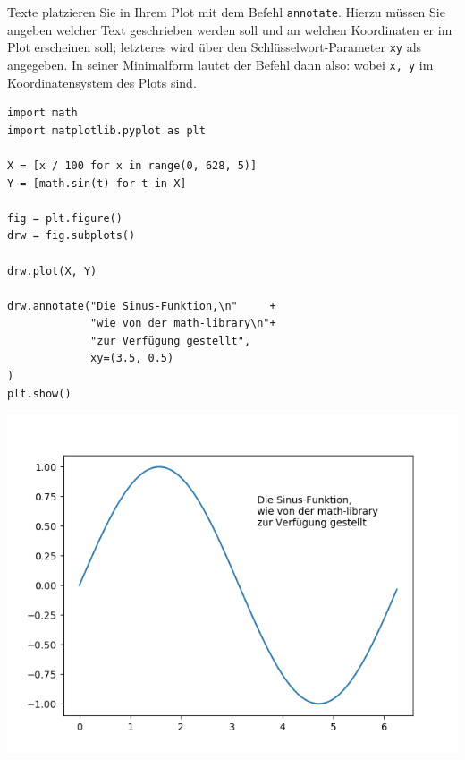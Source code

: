 Texte platzieren Sie in Ihrem Plot mit dem Befehl \texttt{annotate}. Hierzu müssen Sie angeben welcher Text geschrieben werden soll und an welchen Koordinaten er im Plot erscheinen soll; letzteres wird über den Schlüsselwort-Parameter \texttt{xy} als  angegeben. In seiner Minimalform lautet der Befehl dann also:
wobei \texttt{x, y} im Koordinatensystem des Plots sind.

\begin{codebox}[Beispiel: Plot mit Text-Overlay, width=.55\linewidth, nobeforeafter, equal height group = grpXmpSimpleOverlay]
\begin{verbatim}
import math
import matplotlib.pyplot as plt

X = [x / 100 for x in range(0, 628, 5)]
Y = [math.sin(t) for t in X]

fig = plt.figure()
drw = fig.subplots()

drw.plot(X, Y)

drw.annotate("Die Sinus-Funktion,\n"     +
             "wie von der math-library\n"+
             "zur Verfügung gestellt",
             xy=(3.5, 0.5)
)
plt.show()
\end{verbatim}
\end{codebox}
%
\begin{tcolorbox}[title=Ausgabe: Plot mit Text-Overlay, width=.45\linewidth, nobeforeafter, equal height group = grpXmpSimpleOverlay]
	\includegraphics[width=\linewidth]{./gfx/plt-overlay-simple}
\end{tcolorbox}

